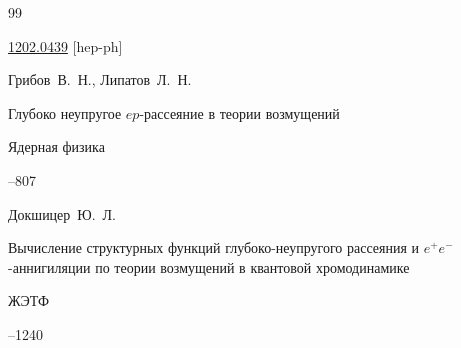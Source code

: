 \begin{thebibliography}{99}


\arxiv \href{http://arxiv.org/abs/1202.0439}{1202.0439}  [hep-ph]




\by Грибов~В.~Н., Липатов~Л.~Н.

\paper  Глубоко неупругое $ep$-рассеяние в теории возмущений

\jour Ядерная физика



--807













\by Докшицер~Ю.~Л.

\paper Вычисление структурных функций глубоко-неупругого рассеяния и $e^+e^-$-аннигиляции по теории возмущений в квантовой хромодинамике

\jour ЖЭТФ 



--1240 














\end{thebibliography}
